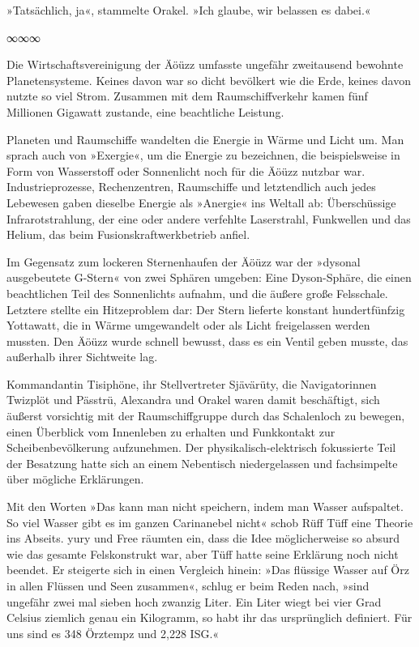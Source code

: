 »Tatsächlich, ja«, stammelte Orakel. »Ich glaube, wir belassen es dabei.«

\begin{center}
∞∞∞
\end{center}

Die Wirtschaftsvereinigung der Äöüzz umfasste ungefähr zweitausend bewohnte Planetensysteme. Keines davon war so dicht bevölkert wie die Erde, keines davon nutzte so viel Strom. Zusammen mit dem Raumschiffverkehr kamen fünf Millionen Gigawatt zustande, eine beachtliche Leistung.

Planeten und Raumschiffe wandelten die Energie in Wärme und Licht um. Man sprach auch von »Exergie«, um die Energie zu bezeichnen, die beispielsweise in Form von Wasserstoff oder Sonnenlicht noch für die Äöüzz nutzbar war. Industrieprozesse, Rechenzentren, Raumschiffe und letztendlich auch jedes Lebewesen gaben dieselbe Energie als »Anergie« ins Weltall ab: Überschüssige Infrarotstrahlung, der eine oder andere verfehlte Laserstrahl, Funkwellen und das Helium, das beim Fusionskraftwerkbetrieb anfiel.

Im Gegensatz zum lockeren Sternenhaufen der Äöüzz war der »dysonal ausgebeutete G-Stern« von zwei Sphären umgeben: Eine Dyson-Sphäre, die einen beachtlichen Teil des Sonnenlichts aufnahm, und die äußere große Felsschale. Letztere stellte ein Hitzeproblem dar: Der Stern lieferte konstant hundertfünfzig Yottawatt, die in Wärme umgewandelt oder als Licht freigelassen werden mussten. Den Äöüzz wurde schnell bewusst, dass es ein Ventil geben musste, das außerhalb ihrer Sichtweite lag.

Kommandantin Tisiphöne, ihr Stellvertreter Sjävärüty, die Navigatorinnen Twizplöt und Pässtrü, Alexandra und Orakel waren damit beschäftigt, sich äußerst vorsichtig mit der Raumschiffgruppe durch das Schalenloch zu bewegen, einen Überblick vom Innenleben zu erhalten und Funkkontakt zur Scheibenbevölkerung aufzunehmen. Der physikalisch-elektrisch fokussierte Teil der Besatzung hatte sich an einem Nebentisch niedergelassen und fachsimpelte über mögliche Erklärungen.

Mit den Worten »Das kann man nicht speichern, indem man Wasser aufspaltet. So viel Wasser gibt es im ganzen Carinanebel nicht« schob Rüff Tüff eine Theorie ins Abseits. yury und Free räumten ein, dass die Idee möglicherweise so absurd wie das gesamte Felskonstrukt war, aber Tüff hatte seine Erklärung noch nicht beendet. Er steigerte sich in einen Vergleich hinein: »Das flüssige Wasser auf Örz in allen Flüssen und Seen zusammen«, schlug er beim Reden nach, »sind ungefähr zwei mal sieben hoch zwanzig Liter. Ein Liter wiegt bei vier Grad Celsius ziemlich genau ein Kilogramm, so habt ihr das ursprünglich definiert. Für uns sind es 348 Örztempz und 2,228 ISG.«

